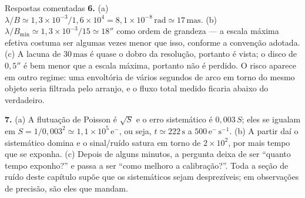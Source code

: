 \documentclass[11pt,a4paper]{article}
\begin{document}
\begin{lessonblock}[borderline west={2pt}{0pt}{astroBlue}]{Respostas comentadas}
\textbf{6.} (a) $\lambda/B\simeq1{,}3\times10^{-3}/1{,}6\times10^{4}=8{,}1\times10^{-8}\,\mathrm{rad}
\simeq17\,\mathrm{mas}$. (b) $\lambda/B_{\min}\simeq1{,}3\times10^{-3}/15\simeq18''$ como ordem de grandeza --- a
escala máxima efetiva costuma ser algumas vezes menor que isso, conforme a convenção adotada. (c) A lacuna de
$30\,\mathrm{mas}$ é quase o dobro da resolução, portanto é vista; o disco de $0{,}5''$ é bem menor que a escala
máxima, portanto não é perdido. O risco aparece em outro regime: uma envoltória de vários segundos de arco em
torno do mesmo objeto seria filtrada pelo arranjo, e o fluxo total medido ficaria abaixo do verdadeiro.

\textbf{7.} (a) A flutuação de Poisson é $\sqrt{S}$ e o erro sistemático é $0{,}003\,S$; eles se igualam em
$S=1/0{,}003^{2}\simeq1{,}1\times10^{5}\,\mathrm{e^-}$, ou seja, $t\simeq222\,\mathrm{s}$ a
$500\,\mathrm{e^-\,s^{-1}}$. (b) A partir daí o sistemático domina e o sinal/ruído satura em torno de $2\times10^{2}$,
por mais tempo que se exponha. (c) Depois de alguns minutos, a pergunta deixa de ser ``quanto tempo exponho?'' e
passa a ser ``como melhoro a calibração?''. Toda a seção de ruído deste capítulo supõe que os sistemáticos sejam
desprezíveis; em observações de precisão, são eles que mandam.
\end{lessonblock}
\end{document}
